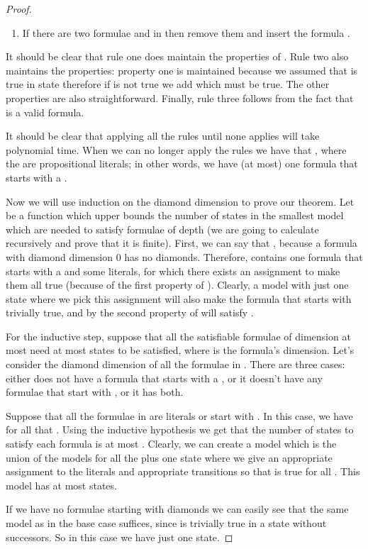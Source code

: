 \documentclass{llncs}
\begin{document}
\begin{proof}
\begin{enumerate}
\item If there are two formulae  and 
in  then remove them and insert the formula .

\end{enumerate}

It should be clear that rule one does maintain the properties of . Rule two
also maintains the properties: property one is maintained because we assumed
that  is true in state  therefore if  is not true we add
 which must be true. The other properties are also straightforward.
Finally, rule three follows from the fact that  is a valid formula.

It should be clear that applying all the rules until none applies will take
polynomial time.  When we can no longer apply the rules we have that , where the
 are propositional literals; in other words, we have (at most) one formula
that starts with a .

Now we will use induction on the diamond dimension to prove our theorem. Let
 be a function which upper bounds the number of states in the smallest
model which are needed to satisfy formulae of depth  (we are going to
calculate  recursively and prove that it is finite).  First, we can say
that , because a formula with diamond dimension 0 has no diamonds.
Therefore,  contains one formula that starts with a  and some
literals, for which there exists an assignment to make them all true (because
of the first property of ). Clearly, a model with just one state where we
pick this assignment will also make the formula that starts with 
trivially true, and by the second property of  will satisfy .

For the inductive step, suppose that all the satisfiable formulae of dimension
at most  need at most  states to be satisfied, where  is
the formula's dimension.  Let's consider the diamond dimension of all the
formulae in .   There are three cases: either  does not have a formula
that starts with a , or it doesn't have any formulae that start with
, or it has both.

Suppose that all the formulae in  are literals or start with . In
this case, we have for all  that . Using the
inductive hypothesis we get that the number of states to satisfy each formula
 is at most . Clearly, we can create a model which is
the union of the models for all the  plus one state where we give an
appropriate assignment to the literals and appropriate transitions so that
 is true for all . This model has at most  states.

If we have no formulae starting with diamonds we can easily see that the same
model as in the base case suffices, since  is trivially true in a
state without successors. So in this case we have just one state.


\end{proof}
\end{document}
